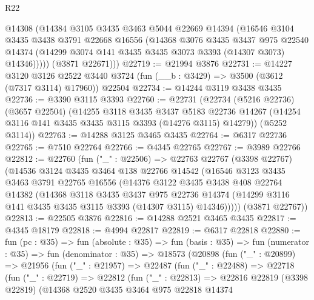 \begin{lexlean}{R22}
\begin{coremodule}
          @14308
          (@14384
            @3105
            @3435
            @3463
            @5044
            @22669
            @14394
            (@16546
              @3104
              @3435
              @3438
              @3791
              @22668
              @16556
              (@14368
                @3076
                @3435
                @3437
                @975
                @22540
                @14374
                (@14299 @3074 @141 @3435 @3435 @3073 @3393 (@14307 @3073) @14346)))))
        (@3871 @22671)))
@22719 := @21994 @3876
@22731 := @14227
    @3120
    @3126
    @2522
    @3440
    @3724
    (fun (__b : @3429) => @3500 (@3612 (@7317 @3114) @17960))
    @22504
@22734 := @14244 @3119 @3438 @3435
@22736 := @3390 @3115 @3393
@22760 := @22731
    (@22734
      (@5216 @22736)
      (@3657 @22504)
      (@14255
        @3118
        @3435
        @3437
        @5183
        @22736
        @14267
        (@14254 @3116 @141 @3435 @3435 @3115 @3393 (@14276 @3115) @14279))
      (@5252 @3114))
@22763 := @14288 @3125 @3465 @3435
@22764 := @6317 @22736
@22765 := @7510 @22764
@22766 := @4345 @22765
@22767 := @3989 @22766
@22812 := @22760
    (fun ("_" : @22506) =>
    @22763
      @22767
      (@3398 @22767)
      (@14536
        @3124
        @3435
        @3464
        @138
        @22766
        @14542
        (@16546
          @3123
          @3435
          @3463
          @3791
          @22765
          @16556
          (@14376
            @3122
            @3435
            @3438
            @408
            @22764
            @14382
            (@14368
              @3118
              @3435
              @3437
              @975
              @22736
              @14374
              (@14299 @3116 @141 @3435 @3435 @3115 @3393 (@14307 @3115) @14346)))))
      (@3871 @22767))
@22813 := @22505 @3876
@22816 := @14288 @2521 @3465 @3435
@22817 := @4345 @18179
@22818 := @4994 @22817
@22819 := @6317 @22818
@22880 := fun (pc : @35) =>
  fun (absolute : @35) =>
  fun (basis : @35) =>
  fun (numerator : @35) =>
  fun (denominator : @35) =>
  @18573
    (@20898
      (fun ("_" : @20899) =>
      @21956
        (fun ("_" : @21957) =>
        @22487
          (fun ("_" : @22488) =>
          @22718
            (fun ("_" : @22719) =>
            @22812
              (fun ("_" : @22813) =>
              @22816
                @22819
                (@3398 @22819)
                (@14368
                  @2520
                  @3435
                  @3464
                  @975
                  @22818
                  @14374

\end{coremodule}
\end{lexlean}

